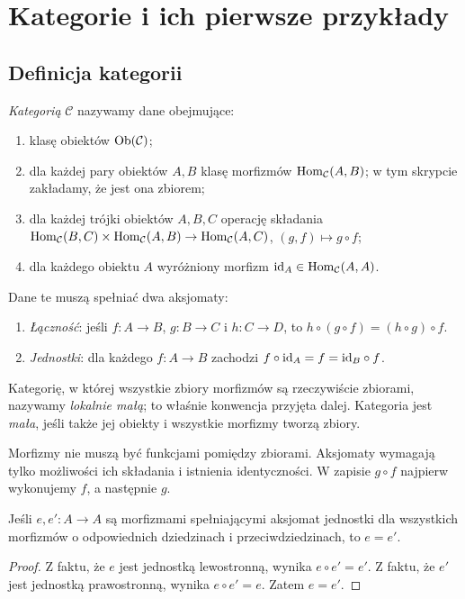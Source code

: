\section{Kategorie i ich pierwsze przykłady}\label{sec:kategorie}

\subsection{Definicja kategorii}

\begin{definicja}[Kategoria]\label{def:kategoria}
\emph{Kategorią} $\mathcal C$ nazywamy dane obejmujące:
\begin{enumerate}
\item klasę obiektów $\operatorname{Ob}(\mathcal C)$;
\item dla każdej pary obiektów $A,B$ klasę morfizmów $\operatorname{Hom}_{\mathcal C}(A,B)$; w tym skrypcie zakładamy, że jest ona zbiorem;
\item dla każdej trójki obiektów $A,B,C$ operację składania
$\operatorname{Hom}_{\mathcal C}(B,C)\times\operatorname{Hom}_{\mathcal C}(A,B)\to\operatorname{Hom}_{\mathcal C}(A,C)$, $(g,f)\mapsto g\circ f$;
\item dla każdego obiektu $A$ wyróżniony morfizm $\mathrm{id}_A\in\operatorname{Hom}_{\mathcal C}(A,A)$.
\end{enumerate}
Dane te muszą spełniać dwa aksjomaty:
\begin{enumerate}[label=(\roman*)]
\item \emph{Łączność}: jeśli $f:A\to B$, $g:B\to C$ i $h:C\to D$, to $h\circ(g\circ f)=(h\circ g)\circ f$.
\item \emph{Jednostki}: dla każdego $f:A\to B$ zachodzi $f\circ\mathrm{id}_A=f=\mathrm{id}_B\circ f$.
\end{enumerate}
Kategorię, w której wszystkie zbiory morfizmów są rzeczywiście zbiorami, nazywamy \emph{lokalnie małą}; to właśnie konwencja przyjęta dalej. Kategoria jest \emph{mała}, jeśli także jej obiekty i wszystkie morfizmy tworzą zbiory.
\end{definicja}

Morfizmy nie muszą być funkcjami pomiędzy zbiorami. Aksjomaty wymagają tylko możliwości ich składania i istnienia identyczności. W zapisie $g\circ f$ najpierw wykonujemy $f$, a następnie $g$.

\begin{lemat}
Jeśli $e,e':A\to A$ są morfizmami spełniającymi aksjomat jednostki dla wszystkich morfizmów o odpowiednich dziedzinach i przeciwdziedzinach, to $e=e'$.
\end{lemat}
\begin{proof}
Z faktu, że $e$ jest jednostką lewostronną, wynika $e\circ e'=e'$. Z faktu, że $e'$ jest jednostką prawostronną, wynika $e\circ e'=e$. Zatem $e=e'$.
\end{proof}


